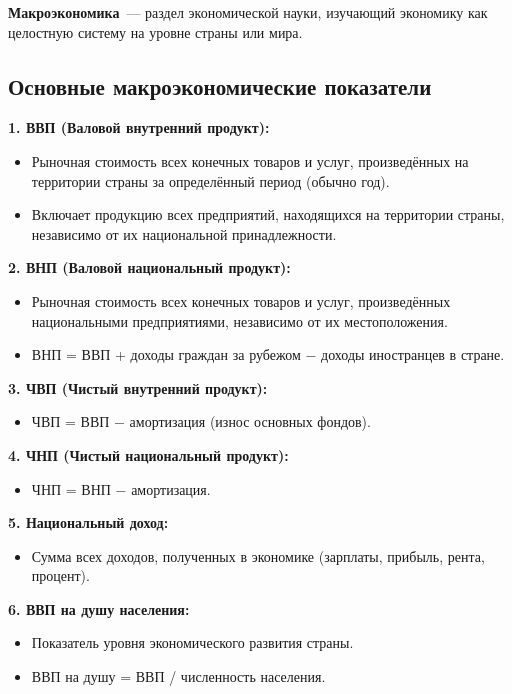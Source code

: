 \documentclass[12pt]{article}
\begin{document}
	\textbf{Макроэкономика}~--- раздел экономической науки, изучающий экономику как целостную систему на уровне страны или мира.
	
	\subsection{Основные макроэкономические показатели}
	
	\textbf{1. ВВП (Валовой внутренний продукт):}
	\begin{itemize}
		\item Рыночная стоимость всех конечных товаров и услуг, произведённых на территории страны за определённый период (обычно год).
		\item Включает продукцию всех предприятий, находящихся на территории страны, независимо от их национальной принадлежности.
	\end{itemize}
	
	\noindent \textbf{2. ВНП (Валовой национальный продукт):}
	\begin{itemize}
		\item Рыночная стоимость всех конечных товаров и услуг, произведённых национальными предприятиями, независимо от их местоположения.
		\item ВНП = ВВП + доходы граждан за рубежом $-$ доходы иностранцев в стране.
	\end{itemize}
	
	\noindent \textbf{3. ЧВП (Чистый внутренний продукт):}
	\begin{itemize}
		\item ЧВП = ВВП $-$ амортизация (износ основных фондов).
	\end{itemize}
	
	\noindent \textbf{4. ЧНП (Чистый национальный продукт):}
	\begin{itemize}
		\item ЧНП = ВНП $-$ амортизация.
	\end{itemize}
	
	\noindent \textbf{5. Национальный доход:}
	\begin{itemize}
		\item Сумма всех доходов, полученных в экономике (зарплаты, прибыль, рента, процент).
	\end{itemize}
	
	\noindent \textbf{6. ВВП на душу населения:}
	\begin{itemize}
		\item Показатель уровня экономического развития страны.
		\item ВВП на душу = ВВП / численность населения.
	\end{itemize}
	
\end{document}
